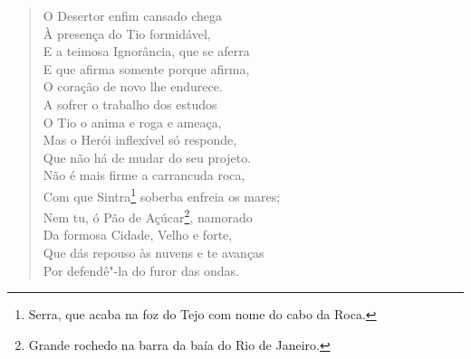 \begin{verse}
O Desertor enfim cansado chega\\
À presença do Tio formidável,\\
E a teimosa Ignorância, que se aferra\\			\index{\Ignor}
E que afirma somente porque afirma,\\
O coração de novo lhe endurece.\\
A sofrer o trabalho dos estudos\\
O Tio o anima e roga e ameaça,\\
Mas o Herói inflexível só responde,\\
Que não há de mudar do seu projeto.\\
Não é mais firme a carrancuda roca,\\
Com que Sintra\footnote{ Serra, que acaba na foz do Tejo com nome do
cabo da Roca.} soberba enfreia os mares;\\
Nem tu, ó Pão de Açúcar\footnote{ Grande rochedo na barra da baía do
Rio de Janeiro.}, namorado\\
Da formosa Cidade, Velho e forte,\\
Que dás repouso às nuvens e te avanças\\
Por defendê"-la do furor das ondas. \\[10pt]



\end{verse}
